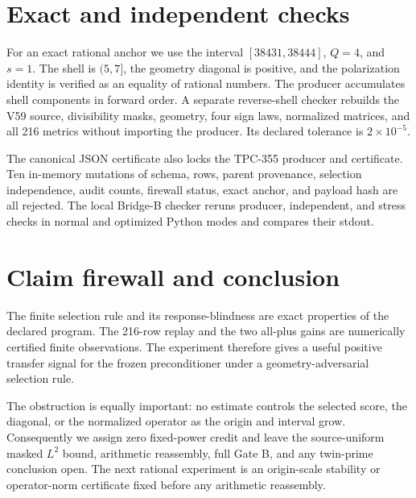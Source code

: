 \documentclass[10pt]{article}
\begin{document}
\section{Exact and independent checks}

For an exact rational anchor we use the interval $[38431,38444]$, $Q=4$,
and $s=1$.  The shell is $(5,7]$, the geometry diagonal is positive, and
the polarization identity is verified as an equality of rational numbers.
The producer accumulates shell components in forward order.  A separate
reverse-shell checker rebuilds the V59 source, divisibility masks, geometry,
four sign laws, normalized matrices, and all 216 metrics without importing
the producer.  Its declared tolerance is $2\times10^{-5}$.

The canonical JSON certificate also locks the TPC-355 producer and
certificate.  Ten in-memory mutations of schema, rows, parent provenance,
selection independence, audit counts, firewall status, exact anchor, and
payload hash are all rejected.  The local Bridge-B checker reruns producer,
independent, and stress checks in normal and optimized Python modes and
compares their stdout.

\section{Claim firewall and conclusion}

The finite selection rule and its response-blindness are exact properties of
the declared program.  The 216-row replay and the two all-plus gains are
numerically certified finite observations.  The experiment therefore gives a
useful positive transfer signal for the frozen preconditioner under a
geometry-adversarial selection rule.

The obstruction is equally important: no estimate controls the selected
score, the diagonal, or the normalized operator as the origin and interval
grow.  Consequently we assign zero fixed-power credit and leave the
source-uniform masked $L^2$ bound, arithmetic reassembly, full Gate B, and any
twin-prime conclusion open.  The next rational experiment is an origin-scale
stability or operator-norm certificate fixed before any arithmetic
reassembly.

\nocite{tpc355,v59}


\end{document}
